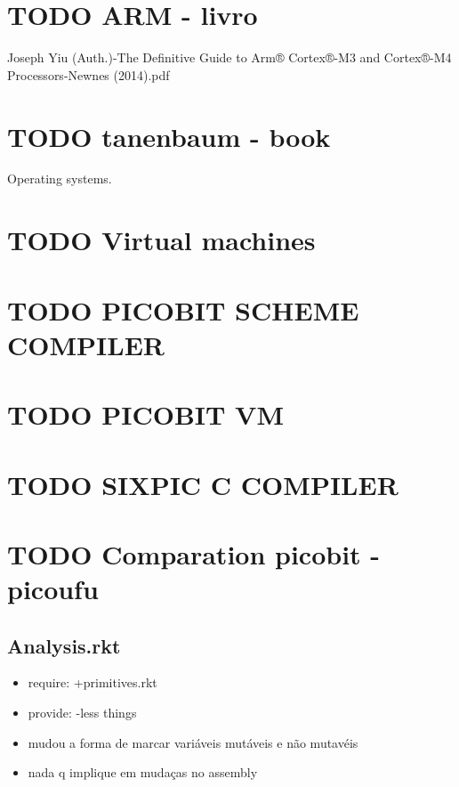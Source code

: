 \documentclass[11pt]{article}
\begin{document}
\section{{\bfseries\sffamily TODO} ARM - livro}
\label{sec-8}

Joseph Yiu (Auth.)-The Definitive Guide to Arm® Cortex®-M3 and Cortex®-M4 Processors-Newnes (2014).pdf

\section{{\bfseries\sffamily TODO} tanenbaum - book}
\label{sec-9}

Operating systems.

\section{{\bfseries\sffamily TODO} Virtual machines}
\label{sec-10}

\section{{\bfseries\sffamily TODO} PICOBIT SCHEME COMPILER}
\label{sec-11}

\section{{\bfseries\sffamily TODO} PICOBIT VM}
\label{sec-12}

\section{{\bfseries\sffamily TODO} SIXPIC C COMPILER}
\label{sec-13}
\section{{\bfseries\sffamily TODO} Comparation picobit - picoufu}
\label{sec-14}
\subsection{Analysis.rkt}
\label{sec-14-1}

\begin{itemize}
\item require: +primitives.rkt
\item provide: -less things
\item mudou a forma de marcar variáveis mutáveis e não mutavéis

\item nada q implique em mudaças no assembly
\end{itemize}
\end{document}

